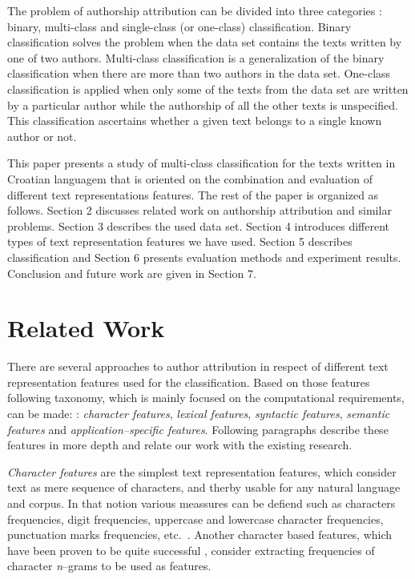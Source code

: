 \documentclass{llncs}
\begin{document}
The problem of authorship attribution can be divided into three categories
\cite{zhao2005effective}: binary, multi-class and single-class (or one-class)
classification. Binary classification solves the problem when the data set
contains the texts written by one of two authors. Multi-class classification is a
generalization of the binary classification when there are more than two authors
in the data set. One-class classification is applied when only some of the texts
from the data set are written by a particular author while the authorship of all
the other texts is unspecified. This classification ascertains whether a given
text belongs to a single known author or not.

This paper presents a study of multi-class classification for the texts written
in Croatian languagem that is oriented on the combination and evaluation of
different text representations features. The rest of the paper is organized as
follows. Section 2 discusses related work on authorship attribution and similar
problems. Section 3 describes the used data set. Section 4 introduces
different types of text representation features we have used. Section 5 describes
classification and Section 6 presents evaluation methods and experiment results. Conclusion and
future work are given in Section 7.

\section{Related Work}
There are several approaches to author attribution in respect of different text
representation features used for the classification. Based on those features
following taxonomy, which is mainly focused on the computational requirements,
can be made: \cite{stamatatos2009survey}: \emph{character features},
\emph{lexical features}, \emph{syntactic features}, \emph{semantic features} and
\emph{application--specific features}. Following paragraphs describe these
features in more depth and relate our work with the existing research.

\emph{Character features} are the simplest text representation features, which
consider text as mere sequence of characters, and therby usable for any natural
language and corpus. In that notion various meassures can be defiend such as
characters frequencies, digit frequencies, uppercase and lowercase character
frequencies, punctuation marks frequencies, etc.~\cite{de2001mining}. Another
character based features, which have been proven to be quite successful
\cite{peng2003language,stamatatos2006ensemble}, consider extracting
frequencies of character \emph{n}--grams to be used as features. 
\end{document}
